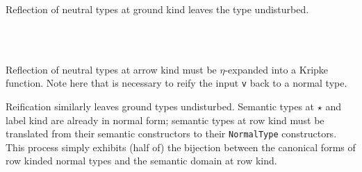 \documentclass[authoryear, acmsmall, screen, review, nonacm]{acmart}
\begin{document}
Reflection of neutral types at ground kind leaves the type undisturbed. 
\begin{code}%
\>[0]\AgdaSpace{}%
\AgdaSymbol{\{}\AgdaSpace{}%
\AgdaSymbol{=}\AgdaSpace{}%
\AgdaSymbol{\}}\AgdaSpace{}%
%
\>[29]\AgdaSymbol{=}\AgdaSpace{}%
\AgdaSpace{}%
\<%
\\
\>[0]\AgdaSpace{}%
\AgdaSymbol{\{}\AgdaSpace{}%
\AgdaSymbol{=}\AgdaSpace{}%
\AgdaSymbol{\}}\AgdaSpace{}%
%
\>[29]\AgdaSymbol{=}\AgdaSpace{}%
\AgdaSpace{}%
\<%
\\
\>[0]\AgdaSpace{}%
\AgdaSymbol{\{}\AgdaSpace{}%
\AgdaSymbol{=}\AgdaSpace{}%
\AgdaOperator{\AgdaInductiveConstructor{R[}}\AgdaSpace{}%
\AgdaSpace{}%
\AgdaOperator{\AgdaInductiveConstructor{]}}\AgdaSymbol{\}}\AgdaSpace{}%
%
\>[29]\AgdaSymbol{=}\AgdaSpace{}%
\AgdaSpace{}%
\AgdaSymbol{(}\AgdaSpace{}%
\AgdaSymbol{)}\<%
\end{code}

\Ni Reflection of neutral types at arrow kind must be $\eta$-expanded into a Kripke function. Note here that is necessary to reify the input \verb!v! back to a normal type.

\begin{code}%
\>[0]\AgdaSpace{}%
\AgdaSymbol{\{}\AgdaSpace{}%
\AgdaSymbol{=}\AgdaSpace{}%
\AgdaSpace{}%
\AgdaSpace{}%
\AgdaSymbol{\}}\AgdaSpace{}%
%
\>[29]\AgdaSymbol{=}\AgdaSpace{}%
\AgdaSpace{}%
\AgdaSpace{}%
\AgdaSpace{}%
\AgdaSpace{}%
\AgdaSpace{}%
\AgdaSymbol{(}\AgdaSpace{}%
\AgdaSpace{}%
\AgdaSpace{}%
\AgdaSpace{}%
\AgdaSpace{}%
\AgdaSymbol{)}\<%
\end{code}

\Ni Reification similarly leaves ground types undisturbed. Semantic types at $\star$ and label kind are already in normal form; semantic types at row kind must be translated from their semantic constructors to their \verb!NormalType! constructors. This process simply exhibits (half of) the bijection between the canonical forms of row kinded normal types and the semantic domain at row kind.
\end{document}
